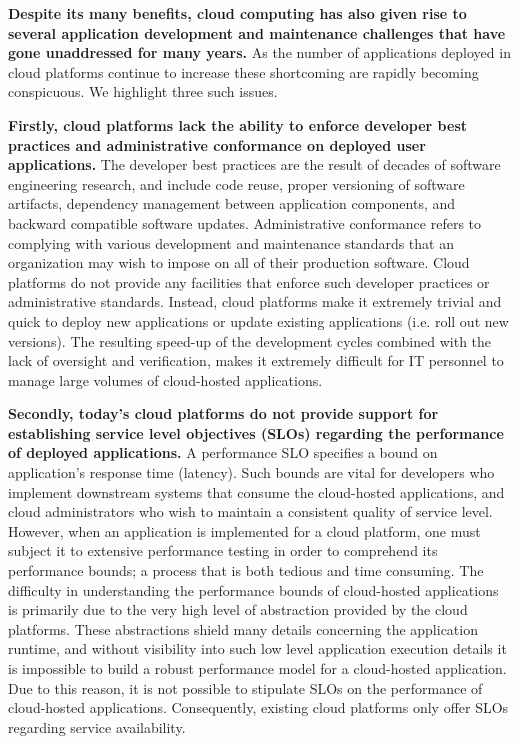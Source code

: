 \textbf{Despite its many benefits, cloud computing has also given rise to several application
development and maintenance challenges that have gone unaddressed for many years.}
As the number of applications deployed in cloud platforms continue to increase these
shortcoming are rapidly becoming conspicuous. We highlight three such issues.
 
\textbf{Firstly, cloud platforms lack the ability to enforce developer best practices
and administrative conformance on deployed user applications.} The developer best practices 
are the result of decades of software engineering research, and
include code reuse, proper versioning of software artifacts, dependency management
between application components, and backward compatible software updates. Administrative
conformance refers to complying with various development and maintenance standards
that an organization may wish to impose on all of their production software.
Cloud platforms do not provide any facilities that enforce such developer practices or
administrative standards. Instead, cloud platforms
make it extremely trivial and quick to deploy new applications or update existing
applications (i.e. roll out new versions). The resulting speed-up of the development cycles combined with the lack of 
oversight and verification, makes it extremely difficult for 
IT personnel to manage large volumes of cloud-hosted applications.

\textbf{Secondly, today's cloud platforms do not provide support for establishing 
service level objectives (SLOs) regarding the performance of deployed applications.} 
A performance SLO specifies a bound on application's response time (latency). 
Such bounds are vital for developers 
who implement downstream systems that consume the cloud-hosted applications,
and cloud administrators who wish to maintain a consistent quality of service
level. However, when an application is implemented for
a cloud platform, one must subject it to extensive performance testing in order
to comprehend its performance bounds; a process that is both 
tedious and time consuming. The difficulty in understanding the performance 
bounds of cloud-hosted applications is primarily due to the very high level of 
abstraction provided by the cloud platforms. These abstractions shield many details 
concerning the application runtime, and without visibility into such low level application 
execution details it is impossible
to build a robust performance model for a cloud-hosted application. Due to this
reason, it is not possible to stipulate SLOs on the performance of cloud-hosted applications. 
Consequently, existing cloud platforms only offer SLOs regarding service availability.

